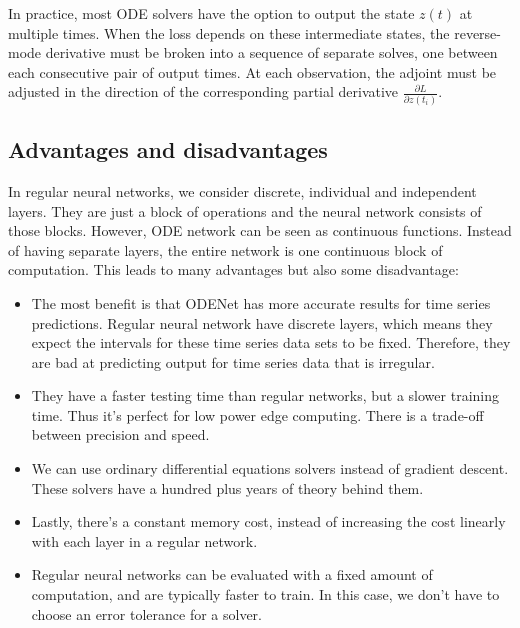\documentclass[10pt,a4paper]{article}
\theoremstyle{definition}
\theoremstyle{definition}
\theoremstyle{definition}
\begin{document}
In practice, most ODE solvers have the option to output the state $z(t)$ at multiple times. When the loss depends on these intermediate states, the reverse-mode derivative must be broken into a sequence of separate solves, one between each consecutive pair of output times. At each observation, the adjoint must be adjusted in the direction of the corresponding partial derivative $\frac{\partial L}{\partial z(t_i)}$.


 


\subsection{Advantages and disadvantages}

In regular neural networks, we consider discrete, individual and independent layers. They are just a block of operations and the neural network consists of those blocks. However, ODE network can be seen as continuous functions. Instead of having separate layers, the entire network is one continuous block of computation. This leads to many advantages but also some disadvantage:
\begin{itemize}
\item The most benefit is that ODENet has more accurate results for time series predictions. Regular neural network have discrete layers, which means they expect the intervals for these time series data sets to be fixed. Therefore, they are bad at predicting output for time series data that is irregular.
\item They have a faster testing time than regular networks, but a slower training time. Thus it's perfect for low power edge computing. There is a trade-off between precision and speed.
\item We can use ordinary differential equations solvers instead of gradient descent. These solvers have a hundred plus years of theory behind them.
\item Lastly, there's a constant memory cost, instead of increasing the cost linearly with each layer in a regular network.
\item Regular neural networks can be evaluated with a fixed amount of computation, and are typically faster to train. In this case, we don't have to choose an error tolerance for a solver.
\end{itemize}
\end{document}
